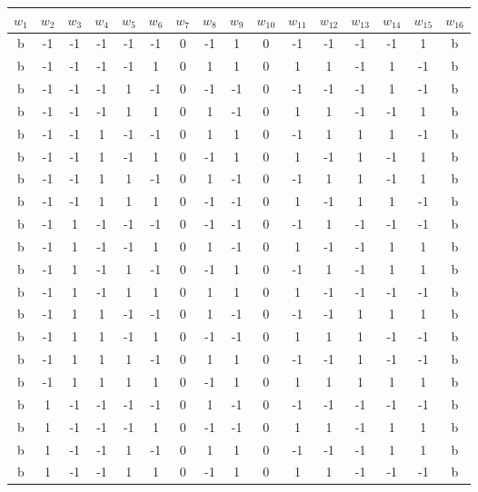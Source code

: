\documentclass[12pt]{article}
\theoremstyle{plain}
\theoremstyle{definition}
\theoremstyle{remark}
\theoremstyle{definition}
\begin{document}
\begin{center}
\begin{tabular}{|c|c|c|c|c|c|c|c|c|c|c|c|c|c|c|c|} 
\hline
$w_{1}$ & $w_{2}$ & $w_{3}$ & $w_{4}$ & $w_{5}$ & $w_{6}$ & $w_{7}$ & $w_{8}$ & $w_{9}$ & $w_{10}$ & $w_{11}$ & $w_{12}$ & $w_{13}$ & $w_{14}$ & $w_{15}$ & $w_{16}$ \\
\hline
b & -1 & -1 & -1 & -1 & -1 & 0 & -1 & 1 & 0 & -1 & -1 & -1 & -1 & 1 & b \\
b & -1 & -1 & -1 & -1 & 1 & 0 & 1 & 1 & 0 & 1 & 1 & -1 & 1 & -1 & b \\
b & -1 & -1 & -1 & 1 & -1 & 0 & -1 & -1 & 0 & -1 & -1 & -1 & 1 & -1 & b \\
b & -1 & -1 & -1 & 1 & 1 & 0 & 1 & -1 & 0 & 1 & 1 & -1 & -1 & 1 & b \\
b & -1 & -1 & 1 & -1 & -1 & 0 & 1 & 1 & 0 & -1 & 1 & 1 & 1 & -1 & b \\
b & -1 & -1 & 1 & -1 & 1 & 0 & -1 & 1 & 0 & 1 & -1 & 1 & -1 & 1 & b \\
b & -1 & -1 & 1 & 1 & -1 & 0 & 1 & -1 & 0 & -1 & 1 & 1 & -1 & 1 & b \\
b & -1 & -1 & 1 & 1 & 1 & 0 & -1 & -1 & 0 & 1 & -1 & 1 & 1 & -1 & b \\
b & -1 & 1 & -1 & -1 & -1 & 0 & -1 & -1 & 0 & -1 & 1 & -1 & -1 & -1 & b \\
b & -1 & 1 & -1 & -1 & 1 & 0 & 1 & -1 & 0 & 1 & -1 & -1 & 1 & 1 & b \\
b & -1 & 1 & -1 & 1 & -1 & 0 & -1 & 1 & 0 & -1 & 1 & -1 & 1 & 1 & b \\
b & -1 & 1 & -1 & 1 & 1 & 0 & 1 & 1 & 0 & 1 & -1 & -1 & -1 & -1 & b \\
b & -1 & 1 & 1 & -1 & -1 & 0 & 1 & -1 & 0 & -1 & -1 & 1 & 1 & 1 & b \\
b & -1 & 1 & 1 & -1 & 1 & 0 & -1 & -1 & 0 & 1 & 1 & 1 & -1 & -1 & b \\
b & -1 & 1 & 1 & 1 & -1 & 0 & 1 & 1 & 0 & -1 & -1 & 1 & -1 & -1 & b \\
b & -1 & 1 & 1 & 1 & 1 & 0 & -1 & 1 & 0 & 1 & 1 & 1 & 1 & 1 & b \\
b & 1 & -1 & -1 & -1 & -1 & 0 & 1 & -1 & 0 & -1 & -1 & -1 & -1 & -1 & b \\
b & 1 & -1 & -1 & -1 & 1 & 0 & -1 & -1 & 0 & 1 & 1 & -1 & 1 & 1 & b \\
b & 1 & -1 & -1 & 1 & -1 & 0 & 1 & 1 & 0 & -1 & -1 & -1 & 1 & 1 & b \\
b & 1 & -1 & -1 & 1 & 1 & 0 & -1 & 1 & 0 & 1 & 1 & -1 & -1 & -1 & b \\

\end{tabular}
\end{center}
\end{document}
